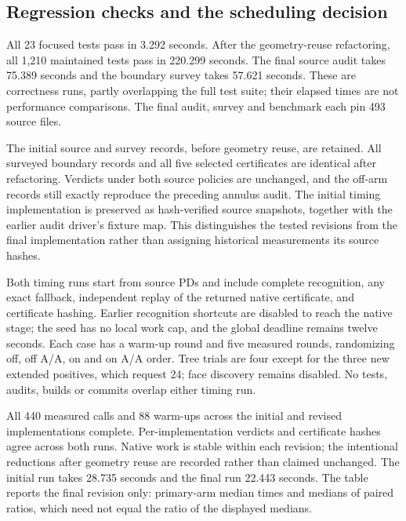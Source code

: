 \subsection{Regression checks and the scheduling decision}

All 23 focused tests pass in 3.292 seconds. After the geometry-reuse
refactoring, all 1,210 maintained tests pass in 220.299 seconds. The final
source audit takes 75.389 seconds and the boundary survey takes 57.621
seconds. These are correctness runs, partly overlapping the full test
suite; their elapsed times are not performance comparisons. The final
audit, survey and benchmark each pin 493 source files.

The initial source and survey records, before geometry reuse, are retained.
All surveyed boundary records and all five selected certificates are
identical after refactoring. Verdicts under both source policies are
unchanged, and the off-arm records still exactly reproduce the preceding
annulus audit. The initial timing implementation is preserved as
hash-verified source snapshots, together with the earlier audit driver's
fixture map. This distinguishes the tested revisions from the final
implementation rather than assigning historical measurements its source
hashes.

Both timing runs start from source PDs and include complete recognition,
any exact fallback, independent replay of the returned native certificate,
and certificate hashing. Earlier recognition shortcuts are disabled to
reach the native stage; the seed has no local work cap, and the global
deadline remains twelve seconds. Each case has a warm-up round and five
measured rounds, randomizing off, off A/A, on and on A/A order. Tree trials
are four except for the three new extended positives, which request 24;
face discovery remains disabled. No tests, audits, builds or commits
overlap either timing run.

All 440 measured calls and 88 warm-ups across the initial and revised
implementations complete. Per-implementation verdicts and certificate
hashes agree across both runs. Native work is stable within each revision;
the intentional reductions after geometry reuse are recorded rather than
claimed unchanged. The initial run takes 28.735 seconds and the final run
22.443 seconds. The table reports the final revision only: primary-arm
median times and medians of paired ratios, which need not equal the ratio
of the displayed medians.

\begin{center}
\small
\end{center}

